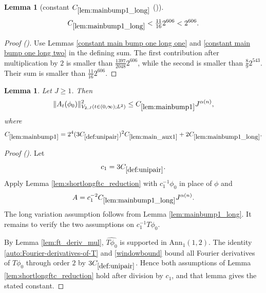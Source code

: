 \documentclass[12pt,reqno]{amsart}
\newcommand{\auto}{{({\tiny\faCar})}}
\theoremstyle{plain}
\newtheorem{lemma}[theorem]{Lemma}
\numberwithin{equation}{section}
\theoremstyle{remark}
\newcommand{\uses}[1]{}
\newcommand{\usesdefs}[1]{}
\begin{document}
\begin{lemma}[constant $C_{\ref{lem:mainbump1_long}}$ \auto]\label{constant main bump one long}\uses{constant main bump one long one,constant main bump one long two,lem:mainbump1_long}\usesdefs{}
\begin{equation}\label{constant main bump one long bound}
C_{\ref{lem:mainbump1_long}}<\tfrac{11}{16}2^{606}<2^{606}.
\end{equation}
\end{lemma}
\begin{proof}[Proof \auto]
Use Lemmas \ref{constant main bump one long one} and \ref{constant main bump one long two} in the defining sum. The first contribution after multiplication by $2$ is smaller than $\frac{1397}{2048}2^{606}$, while the second is smaller than $\frac89 2^{543}$. Their sum is smaller than $\frac{11}{16}2^{606}$.
\end{proof}

\begin{lemma}\label{lem:mainbump1}\uses{lem:shortlongftc_reduction,lem:mainbump1_long,lem:ft_deriv_mul}\usesdefs{A_def,def:cn-window,def:unipair}
Let $J\ge1$. Then
\begin{equation}\label{mainbump1}
\|A_t(\phi_0)\|_{V_{2,J}(t\in(0,\infty);L^2)}^2
\le C_{\ref{lem:mainbump1}}J^{\alpha(n)},
\end{equation}
where
\begin{equation}\label{auto:main-bump-one-constant-definition}
C_{\ref{lem:mainbump1}}
=2^4(3C_{\ref{def:unipair}})^2C_{\ref{lem:main_aux1}}
+2C_{\ref{lem:mainbump1_long}}.
\end{equation}
\end{lemma}

\begin{proof}[Proof \auto]
Let
\[
c_1=3C_{\ref{def:unipair}}.
\]
Apply Lemma \ref{lem:shortlongftc_reduction} with $c_1^{-1}\phi_0$ in place of $\phi$ and
\[
A=c_1^{-2}C_{\ref{lem:mainbump1_long}}J^{\alpha(n)}.
\]
The long variation assumption follows from Lemma \ref{lem:mainbump1_long}. It remains to verify the two assumptions on $c_1^{-1}T\phi_0$.

By Lemma \ref{lem:ft_deriv_mul}, $\widehat{T\phi_0}$ is supported in $\mathrm{Ann}_1(1,2)$. The identity \eqref{auto:Fourier-derivatives-of-T} and \eqref{windowbound} bound all Fourier derivatives of $T\phi_0$ through order $2$ by $3C_{\ref{def:unipair}}$. Hence both assumptions of Lemma \ref{lem:shortlongftc_reduction} hold after division by $c_1$, and that lemma gives the stated constant.
\end{proof}
\end{document}
